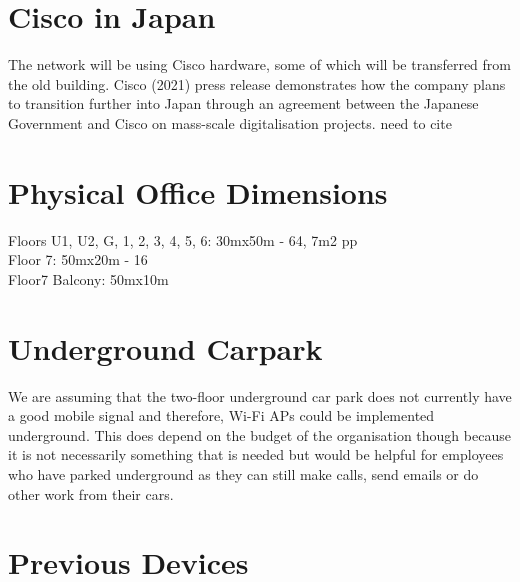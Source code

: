 \section{Cisco in Japan}
The network will be using Cisco hardware, some of which will be transferred from the old 
building. Cisco (2021) press release demonstrates how the company plans to transition further into Japan through an agreement between the Japanese Government and Cisco on mass-scale digitalisation projects.
need to cite \parencite{cisco-japan}
\section{Physical Office Dimensions}
Floors U1, U2, G, 1, 2, 3, 4, 5, 6: 30mx50m - 64, 7m2 pp \\
Floor 7: 50mx20m - 16 \\
Floor7 Balcony: 50mx10m \\
\section{Underground Carpark}
We are assuming that the two-floor underground car park does not currently have a good mobile signal and therefore, Wi-Fi APs could be implemented underground. This does depend on the budget of the organisation though because it is not necessarily something that is needed but would be helpful for employees who have parked underground as they can still make calls, send emails or do other work from their cars.
\section{Previous Devices}